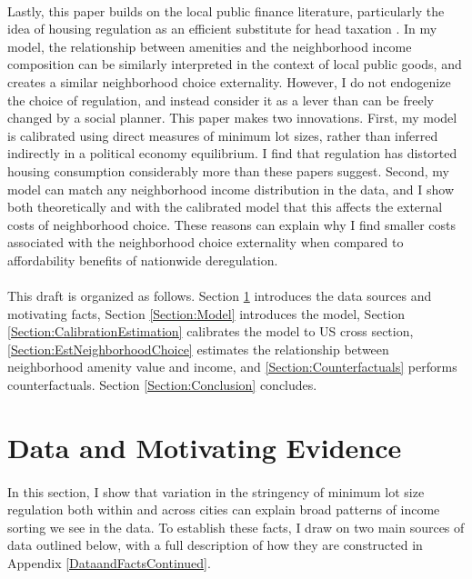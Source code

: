 \documentclass[12pt]{article}
\begin{document}
	\paragraph*{}
	Lastly, this paper builds on the local public finance literature, particularly the idea of housing regulation as an efficient substitute for head taxation \citep{hamilton1976, calabresetal, FernRogerson1996,  keepingpeopleout, eppleplatt, ineffTiebout, barcoate}. In my model, the relationship between amenities and the neighborhood income composition can be similarly interpreted in the context of local public goods, and creates a similar neighborhood choice externality. However, I do not endogenize the choice of regulation, and instead consider it as a lever than can be freely changed by a social planner. This paper makes two innovations. First, my model is calibrated using direct measures of minimum lot sizes, rather than inferred indirectly in a political economy equilibrium. I find that regulation has distorted housing consumption considerably more than these papers suggest. Second, my model can match any neighborhood income distribution in the data, and I show both theoretically and with the calibrated model that this affects the external costs of neighborhood choice. These reasons can explain why I find smaller costs associated with the neighborhood choice externality when compared to affordability benefits of nationwide deregulation. 
	
	\paragraph*{}
	This draft is organized as follows. Section \ref{Section:Evidence} introduces the data sources and motivating facts, Section \ref{Section:Model} introduces the model, Section \ref{Section:CalibrationEstimation} calibrates the model to US cross section, \ref{Section:EstNeighborhoodChoice} estimates the relationship between neighborhood amenity value and income, and \ref{Section:Counterfactuals} performs counterfactuals. Section \ref{Section:Conclusion} concludes.


	\section{Data and Motivating Evidence}\label{Section:Evidence}

	\paragraph*{}
	In this section, I show that variation in the stringency of minimum lot size regulation both within and across cities can explain broad patterns of income sorting we see in the data. To establish these facts, I draw on two main sources of data outlined below, with a full description of how they are constructed in Appendix \ref{DataandFactsContinued}.
	
\end{document}
